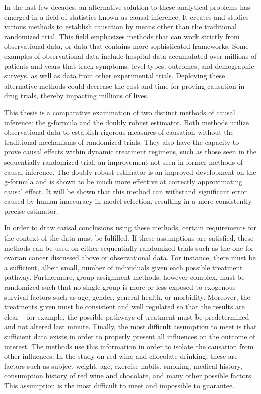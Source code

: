 In the last few decades, an alternative solution to these analytical problems has emerged in a field of statistics known as causal inference.  It creates and studies various methods to establish causation by means other than the traditional randomized trial.  This field emphasizes methods that can work strictly from observational data, or data that contains more sophisticated frameworks.  Some examples of observational data include hospital data accumulated over millions of patients and years that track symptoms, level types, outcomes, and demographic surveys, as well as data from other experimental trials.  Deploying these alternative methods could decrease the cost and time for proving causation in drug trials, thereby impacting millions of lives.  

This thesis is a comparative examination of two distinct methods of causal inference: the g-formula and the doubly robust estimator.  Both methods utilize observational data to establish rigorous measures of causation without the traditional mechanisms of randomized trials.  They also have the capacity to prove causal effects within dynamic treatment regimens, such as those seen in the sequentially randomized trial, an improvement not seen in former methods of causal inference.  The doubly robust estimator is an improved development on the g-formula and is shown to be much more effective at correctly approximating causal effect.  It will be shown that this method can withstand significant error caused by human inaccuracy in model selection, resulting in a more consistently precise estimator.  

In order to draw causal conclusions using these methods, certain requirements for the context of the data must be fulfilled.  If these assumptions are satisfied, these methods can be used on either sequentially randomized trials such as the one for ovarian cancer discussed above or observational data.  For instance, there must be a sufficient, albeit small, number of individuals given each possible treatment pathway.  Furthermore, group assignment methods, however complex, must be randomized such that no single group is more or less exposed to exogenous survival factors such as age, gender, general health, or morbidity.  Moreover, the treatments given must be consistent and well regulated so that the results are clear -- for example, the possible pathways of treatment must be predetermined and not altered last minute.  Finally, the most difficult assumption to meet is that sufficient data exists in order to properly present all influences on the outcome of interest.  The methods use this information in order to isolate the causation from other influences.  In the study on red wine and chocolate drinking, these are factors such as subject weight, age, exercise habits, smoking, medical history, consumption history of red wine and chocolate, and many other possible factors.  This assumption is the most difficult to meet and impossible to guarantee.  
  
